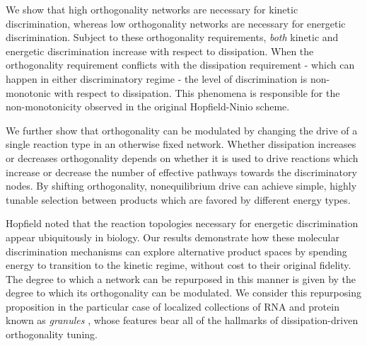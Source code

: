 We show that high orthogonality networks are necessary for kinetic discrimination, whereas low orthogonality networks are necessary for energetic discrimination.  Subject to these orthogonality requirements, {\it both} kinetic and energetic discrimination increase with respect to dissipation.  When the orthogonality requirement conflicts with the dissipation requirement - which can happen in either discriminatory regime - the level of discrimination is non-monotonic with respect to dissipation.  This phenomena is responsible for the non-monotonicity observed in the original Hopfield-Ninio scheme.

We further show that orthogonality can be modulated by changing the drive of a single reaction type in an otherwise fixed network.  Whether dissipation increases or decreases orthogonality depends on whether it is used to drive reactions which increase or decrease the number of effective pathways towards the discriminatory nodes.  By shifting orthogonality, nonequilibrium drive can achieve simple, highly tunable selection between products which are favored by different energy types.

Hopfield noted that the reaction topologies necessary for energetic discrimination appear ubiquitously in biology.  Our results demonstrate how these molecular discrimination mechanisms can explore alternative product spaces by spending energy to transition to the kinetic regime, without cost to their original fidelity.  The degree to which a network can be repurposed in this manner is given by the degree to which its orthogonality can be modulated.  We consider this repurposing proposition in the particular case of localized collections of RNA and protein known as {\it granules} \cite{Brangwynne2009}, whose features bear all of the hallmarks of dissipation-driven orthogonality tuning.
